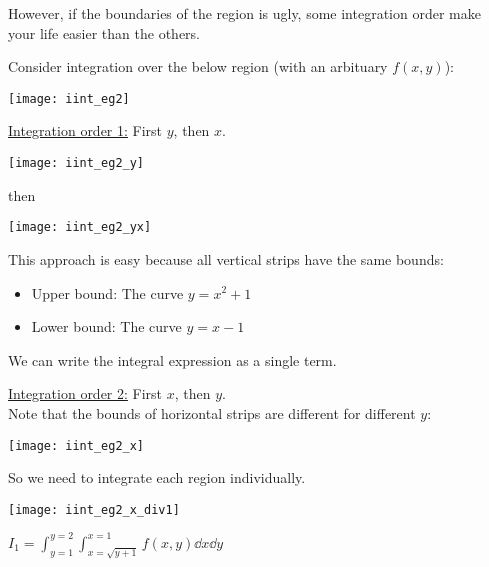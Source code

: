 \documentclass[class=article, crop=false, 12pt]{standalone}
\begin{document}
However, if the boundaries of the region is ugly, 
some integration order make your life easier than the others.

\begin{example}

    Consider integration over the below region (with an arbituary $f(x,y)$):

    \begin{center}
        \texttt{[image: iint\_eg2]}
    \end{center}

    \ul{Integration order 1:} First $y$, then $x$.

    \begin{center}
        \begin{minipage}{0.4\textwidth}
            \centering
            \texttt{[image: iint\_eg2\_y]}
        \end{minipage}
        then
        \begin{minipage}{0.5\textwidth}
            \centering
            \texttt{[image: iint\_eg2\_yx]}
        \end{minipage}
    \end{center}

    This approach is easy because all vertical strips have the same bounds:
    \begin{itemize}
        \item Upper bound: The curve $y=x^2+1$
        \item Lower bound: The curve $y=x-1$
    \end{itemize}

    We can write the integral expression as a single term.

    \ul{Integration order 2:} First $x$, then $y$.\\

    Note that the bounds of horizontal strips are different for different $y$:

    \begin{center}
        \texttt{[image: iint\_eg2\_x]}
    \end{center}

    So we need to integrate each region individually.

    \begin{center}
        \begin{minipage}{0.35\textwidth}
            \centering
            \texttt{[image: iint\_eg2\_x\_div1]}
        \end{minipage}
        $\displaystyle I_1 = \int_{y=1}^{y=2}\int_{x=\sqrt{y+1}}^{x=1} f(x,y) \dd{x}\dd{y}$
    \end{center}


\end{example}
\end{document}
